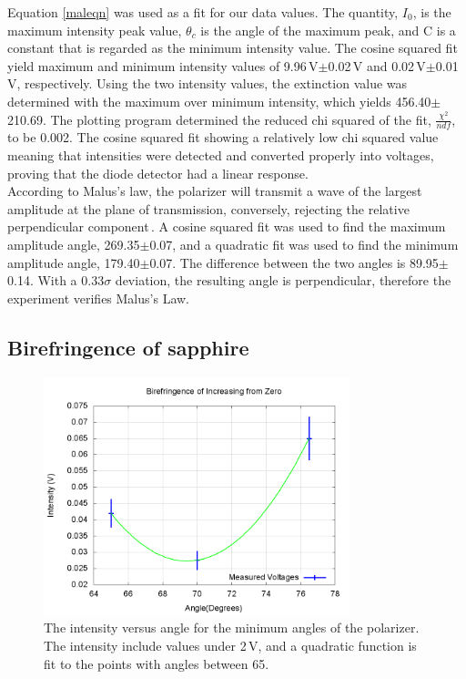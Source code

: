 \documentclass[aps,prl,twocolumn,superscriptaddress,nofootinbib]{revtex4-1}
\begin{document}
Equation \ref{maleqn} was used as a fit for our data values. The quantity, $I_0$, is the maximum intensity peak value, $\theta_c$ is the angle of the maximum peak, and C is a constant that is regarded as the minimum intensity value. The cosine squared fit yield maximum and minimum intensity values of 9.96\,V$\pm$0.02\,V and 0.02\,V$\pm$0.01\,V, respectively. Using the two intensity values, the extinction value was determined with the maximum over minimum intensity, which yields 456.40$\pm$210.69. The plotting program determined the reduced chi squared of the fit, $\frac{\chi^2}{ndf}$, to be 0.002. The cosine squared fit showing a relatively low chi squared value meaning that intensities were detected and converted properly into voltages, proving that the diode detector had a linear response.
\\
\indent According to Malus's law, the polarizer will transmit a wave of the largest amplitude at the plane of transmission, conversely, rejecting the relative perpendicular component\,\cite{4}. A cosine squared fit was used to find the maximum amplitude angle, 269.35\degree$\pm$0.07\degree, and a quadratic fit was used to find the minimum amplitude angle, 179.40\degree$\pm$0.07\degree. The difference between the two angles is 89.95\degree$\pm$0.14\degree. With a 0.33$\sigma$ deviation, the resulting angle is perpendicular, therefore the experiment verifies Malus's Law.

\subsection{Birefringence of sapphire}
\begin{figure}[h!]
  \begin{center}
\centerline{\includegraphics[width=3.5in]{bire1.png}}
\caption{\small{The intensity versus angle for the minimum angles of the polarizer. The intensity include values under 2\,V, and a quadratic function is fit to the points with angles between 65\degree. \label{bire1}}}
  \end{center}
\end{figure}
\vspace{-.7cm}
\end{document}
